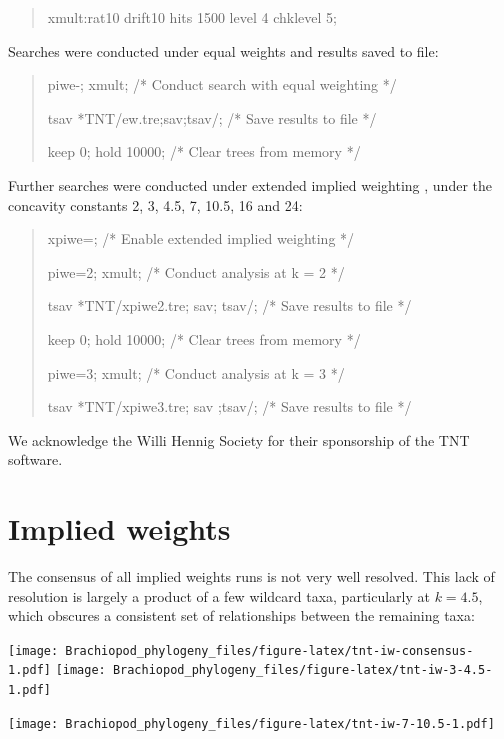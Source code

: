 \documentclass[openany]{book}
\theoremstyle{definition}
\theoremstyle{definition}
\theoremstyle{definition}
\theoremstyle{remark}
\begin{document}
\begin{quote}
xmult:rat10 drift10 hits 1500 level 4 chklevel 5;
\end{quote}

Searches were conducted under equal weights and results saved to file:

\begin{quote}
piwe-; xmult; {/* Conduct search with equal weighting */}

tsav *TNT/ew.tre;sav;tsav/; {/* Save results to file */}

keep 0; hold 10000; {/* Clear trees from memory */}
\end{quote}

Further searches were conducted under extended implied weighting
\citep{Goloboff1997, Goloboff2014}, under the concavity constants 2, 3,
4.5, 7, 10.5, 16 and 24:

\begin{quote}
xpiwe=; {/* Enable extended implied weighting */}

piwe=2; xmult; {/* Conduct analysis at k = 2 */}

tsav *TNT/xpiwe2.tre; sav; tsav/; {/* Save results to file */}

keep 0; hold 10000; {/* Clear trees from memory */}

piwe=3; xmult; {/* Conduct analysis at k = 3 */}

tsav *TNT/xpiwe3.tre; sav ;tsav/; {/* Save results to file */}
\end{quote}

We acknowledge the Willi Hennig Society for their sponsorship of the TNT
software.

\hypertarget{implied-weights}{%
\section{Implied weights}\label{implied-weights}}

The consensus of all implied weights runs is not very well resolved.
This lack of resolution is largely a product of a few wildcard taxa,
particularly at \(k = 4.5\), which obscures a consistent set of
relationships between the remaining taxa:

\texttt{[image: Brachiopod\_phylogeny\_files/figure-latex/tnt-iw-consensus-1.pdf]}
\texttt{[image: Brachiopod\_phylogeny\_files/figure-latex/tnt-iw-3-4.5-1.pdf]}

\texttt{[image: Brachiopod\_phylogeny\_files/figure-latex/tnt-iw-7-10.5-1.pdf]}
\end{document}
